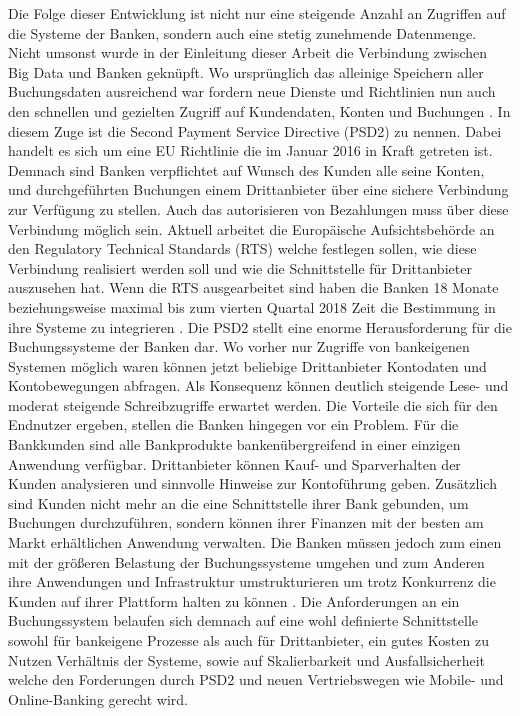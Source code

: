 \documentclass[12pt,oneside,a4paper,parskip]{scrbook}
\begin{document}
Die Folge dieser Entwicklung ist nicht nur eine steigende Anzahl an Zugriffen auf die Systeme der Banken, sondern auch eine stetig zunehmende Datenmenge. Nicht umsonst wurde in der Einleitung dieser Arbeit die Verbindung zwischen Big Data und Banken geknüpft. Wo ursprünglich das alleinige Speichern aller Buchungsdaten ausreichend war fordern neue Dienste und Richtlinien nun auch den schnellen und gezielten Zugriff auf Kundendaten, Konten und Buchungen \cite{bigdataBigStorage}. In diesem Zuge ist die Second Payment Service Directive (PSD2) zu nennen. Dabei handelt es sich um eine EU Richtlinie die im Januar 2016 in Kraft getreten ist. Demnach sind Banken verpflichtet auf Wunsch des Kunden alle seine Konten, und durchgeführten Buchungen einem Drittanbieter über eine sichere Verbindung zur Verfügung zu stellen. Auch das autorisieren von Bezahlungen muss über diese Verbindung möglich sein. Aktuell arbeitet die Europäische Aufsichtsbehörde an den Regulatory Technical Standards (RTS) welche festlegen sollen, wie diese Verbindung realisiert werden soll und wie die Schnittstelle für Drittanbieter auszusehen hat. Wenn die RTS ausgearbeitet sind haben die Banken 18 Monate beziehungsweise maximal bis zum vierten Quartal 2018 Zeit die Bestimmung in ihre Systeme zu integrieren \cite{eu-psd2}\cite{psd2dk}. Die PSD2 stellt eine enorme Herausforderung für die Buchungssysteme der Banken dar. Wo vorher nur Zugriffe von bankeigenen Systemen möglich waren können jetzt beliebige Drittanbieter Kontodaten und Kontobewegungen abfragen. Als Konsequenz können deutlich steigende Lese- und moderat steigende Schreibzugriffe erwartet werden. Die Vorteile die sich für den Endnutzer ergeben, stellen die Banken hingegen vor ein Problem. Für die Bankkunden sind alle Bankprodukte bankenübergreifend in einer einzigen Anwendung verfügbar. Drittanbieter können Kauf- und Sparverhalten der Kunden analysieren und sinnvolle Hinweise zur Kontoführung geben. Zusätzlich sind Kunden nicht mehr an die eine Schnittstelle ihrer Bank gebunden, um Buchungen durchzuführen, sondern können ihrer Finanzen mit der besten am Markt erhältlichen Anwendung verwalten. Die Banken müssen jedoch zum einen mit der größeren Belastung der Buchungssysteme umgehen und zum Anderen ihre Anwendungen und Infrastruktur umstrukturieren um trotz Konkurrenz die Kunden auf ihrer Plattform halten zu können \cite{psd2vid}.
Die Anforderungen an ein Buchungssystem belaufen sich demnach auf eine wohl definierte Schnittstelle sowohl für bankeigene Prozesse als auch für Drittanbieter, ein gutes Kosten zu Nutzen Verhältnis der Systeme, sowie auf Skalierbarkeit und Ausfallsicherheit welche den Forderungen durch PSD2 und neuen Vertriebswegen wie Mobile- und Online-Banking gerecht wird.
\end{document}
